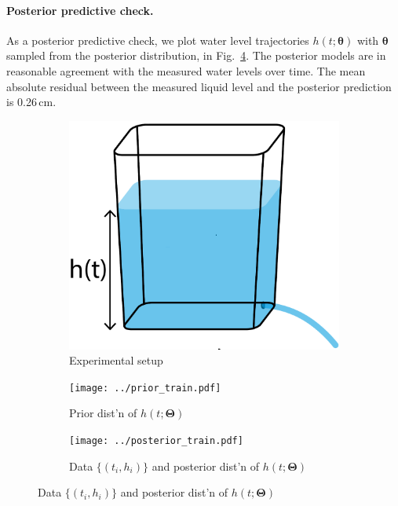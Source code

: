 \documentclass[openacc]{rsproca_new}%
\begin{document}
\paragraph{Posterior predictive check.} As a posterior predictive check, we plot water level trajectories $h(t; \boldsymbol \theta)$ with $\boldsymbol \theta$ sampled from the posterior distribution, in Fig.~\ref{fig:posterior_train}. 
The posterior models are in reasonable agreement with the measured water levels over time. The mean absolute residual between the measured liquid level and the posterior prediction is 0.26\,cm.

\begin{figure}[h!]
    \centering
        \begin{subfigure}[b]{0.3\textwidth}
    	\includegraphics[width=\textwidth]{../tank_geometry/naked_tank.pdf}
	\caption{Experimental setup} \label{fig:naked_tank}
    \end{subfigure}
    
     \begin{subfigure}[b]{0.49\textwidth}
    	\texttt{[image: ../prior\_train.pdf]}
	\caption{Prior dist'n of $h(t; \boldsymbol \Theta)$} \label{fig:prior_train}
    \end{subfigure}
     \begin{subfigure}[b]{0.49\textwidth}
    	\texttt{[image: ../posterior\_train.pdf]}
	\caption{Data $\{(t_i, h_i)\}$ and posterior dist'n of $h(t; \boldsymbol \Theta)$} \label{fig:posterior_train}
    \end{subfigure}
    

\end{figure}
\end{document}
